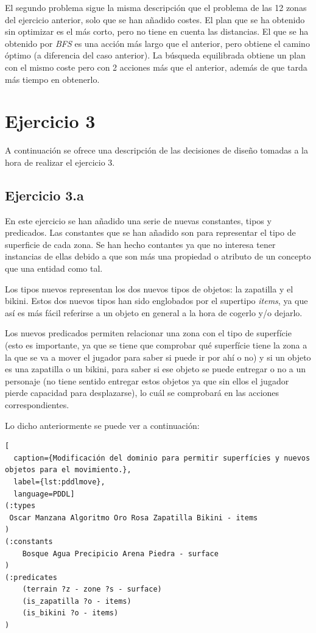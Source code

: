 \documentclass[11pt,a4paper]{article}
\begin{document}
El segundo problema sigue la misma descripción que el problema de las 12 zonas del ejercicio anterior, solo que se han añadido costes.
El plan que se ha obtenido sin optimizar es el más corto, pero no tiene en cuenta las distancias. El que se ha obtenido por
\textit{BFS} es una acción más largo que el anterior, pero obtiene el camino óptimo (a diferencia del caso anterior). La búsqueda
equilibrada obtiene un plan con el mismo coste pero con 2 acciones más que el anterior, además de que tarda más tiempo en obtenerlo.

\section{Ejercicio 3}

A continuación se ofrece una descripción de las decisiones de diseño tomadas a la hora de realizar el ejercicio 3.

\subsection{Ejercicio 3.a}

En este ejercicio se han añadido una serie de nuevas constantes, tipos y predicados. Las constantes que se han añadido son para
representar el tipo de superficie de cada zona. Se han hecho contantes ya que no interesa tener instancias de ellas debido a que son
más una propiedad o atributo de un concepto que una entidad como tal.

Los tipos nuevos representan los dos nuevos tipos de objetos: la zapatilla y el bikini. Estos dos nuevos tipos han sido
englobados por el supertipo \textit{items}, ya que así es más fácil referirse a un objeto en general a la hora de cogerlo y/o dejarlo.

Los nuevos predicados permiten relacionar una zona con el tipo de superfície (esto es importante, ya que se tiene que comprobar qué
superfície tiene la zona a la que se va a mover el jugador para saber si puede ir por ahí o no) y si un objeto es una zapatilla o
un bikini, para saber si ese objeto se puede entregar o no a un personaje (no tiene sentido entregar estos objetos ya que sin ellos
el jugador pierde capacidad para desplazarse), lo cuál se comprobará en las acciones correspondientes.

Lo dicho anteriormente se puede ver a continuación:

\begin{algorithm}[H]
\begin{lstlisting}[
  caption={Modificación del dominio para permitir superfícies y nuevos objetos para el movimiento.},
  label={lst:pddlmove},
  language=PDDL]
(:types
 Oscar Manzana Algoritmo Oro Rosa Zapatilla Bikini - items
)
(:constants
	Bosque Agua Precipicio Arena Piedra - surface
)
(:predicates
	(terrain ?z - zone ?s - surface)
	(is_zapatilla ?o - items)
	(is_bikini ?o - items)
)
\end{lstlisting}
\end{algorithm}
\end{document}

